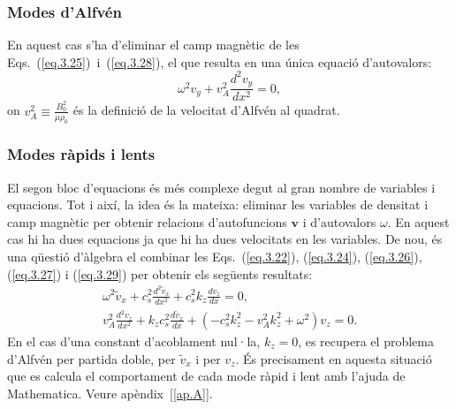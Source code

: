 \documentclass[12pt,a4paper]{article}
\numberwithin{equation}{section}
\begin{document}
\subsubsection{Modes d'Alfvén}
En aquest cas s'ha d'eliminar el camp magnètic de les Eqs.~(\ref{eq.3.25})~i~(\ref{eq.3.28}), el que resulta en una única equació d'autovalors:
\begin{equation}
    \omega^2  v_{y} + v_A^2 \frac{d^2v_{y}}{dx^2} = 0, \tag{3.31} \label{eq.3.31}
\end{equation}
on $v_A^2 \equiv \frac{B_0^2}{\mu \rho_0}$ és la definició de la velocitat d'Alfvén al quadrat.


\subsubsection{Modes ràpids i lents} \label{subsubsec:ones_modes_r_i_l}
El segon bloc d'equacions és més complexe degut al gran nombre de variables i equacions.
Tot i així, la idea és la mateixa: eliminar les variables de densitat i camp magnètic per obtenir relacions d'autofuncions $\bm{v}$ i d'autovalors $\omega$.
En aquest cas hi ha dues equacions ja que hi ha dues velocitats en les variables. De nou, és una qüestió d'àlgebra el combinar les
Eqs.~(\ref{eq.3.22}), (\ref{eq.3.24}), (\ref{eq.3.26}), (\ref{eq.3.27}) i (\ref{eq.3.29}) per obtenir els següents resultats:
\begin{gather}
    \omega^2 \tilde{v}_{x} + c_s^2 \frac{d^2 \tilde{v}_{x}}{dx^2} + c_s^2 k_z \frac{d v_{z}}{dx} = 0, \tag{3.32} \label{eq.3.32} \\
    v_A^2 \frac{d^2 v_{z}}{dx^2} + k_z c_s^2 \frac{d \tilde{v}_{x}}{dx} + \left(-c_s^2 k_z^2 - v_A^2 k_z^2 + \omega^2 \right) v_{z} = 0. \tag{3.33} \label{eq.3.33}
\end{gather}
En el cas d'una constant d'acoblament nul·la, $k_z = 0$, es recupera el problema d'Alfvén per partida doble, per $\tilde{v}_{x}$ i per $v_z$.
És precisament en aquesta situació que es calcula el comportament de cada mode ràpid i lent amb l'ajuda de Mathematica. Veure apèndix~[\ref{ap.A}].


\end{document}
